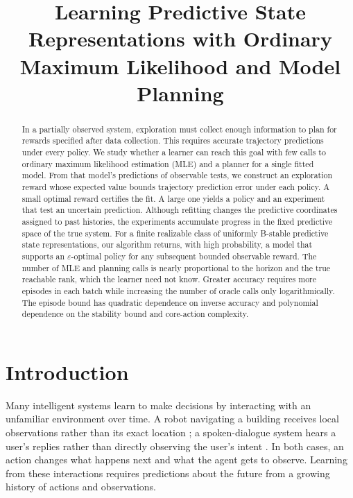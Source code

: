 \documentclass[sigconf,nonacm]{acmart}
\newcommand{\eps}{\varepsilon}
\begin{document}
\title[Learning PSRs with Ordinary MLE]{Learning Predictive State Representations with Ordinary Maximum Likelihood and Model Planning}
\begin{abstract}
In a partially observed system, exploration must collect enough information to plan for rewards specified after data collection. This requires accurate trajectory predictions under every policy. We study whether a learner can reach this goal with few calls to ordinary maximum likelihood estimation (MLE) and a planner for a single fitted model. From that model's predictions of observable tests, we construct an exploration reward whose expected value bounds trajectory prediction error under each policy. A small optimal reward certifies the fit. A large one yields a policy and an experiment that test an uncertain prediction. Although refitting changes the predictive coordinates assigned to past histories, the experiments accumulate progress in the fixed predictive space of the true system. For a finite realizable class of uniformly B-stable predictive state representations, our algorithm returns, with high probability, a model that supports an $\eps$-optimal policy for any subsequent bounded observable reward. The number of MLE and planning calls is nearly proportional to the horizon and the true reachable rank, which the learner need not know. Greater accuracy requires more episodes in each batch while increasing the number of oracle calls only logarithmically. The episode bound has quadratic dependence on inverse accuracy and polynomial dependence on the stability bound and core-action complexity.
\end{abstract}
\maketitle

\section{Introduction}
Many intelligent systems learn to make decisions by interacting with an unfamiliar environment over time. A robot navigating a building receives local observations rather than its exact location \cite{kaelbling1998planning}; a spoken-dialogue system hears a user's replies rather than directly observing the user's intent \cite{young2013dialogue}. In both cases, an action changes what happens next and what the agent gets to observe. Learning from these interactions requires predictions about the future from a growing history of actions and observations.
\end{document}
